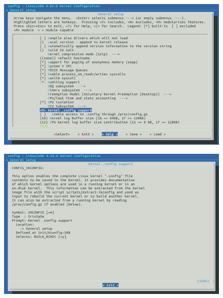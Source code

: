 \documentclass{beamer}
\begin{document}
\begin{frame}
  \begin{figure}[h!]
    \centering
    \includegraphics[scale=0.3]{images/proc-config-1.png}
  \end{figure}
\end{frame}

\begin{frame}
  \begin{figure}[h!]
    \centering
    \includegraphics[scale=0.3]{images/proc-config-2.png}
  \end{figure}
\end{frame}
\end{document}
